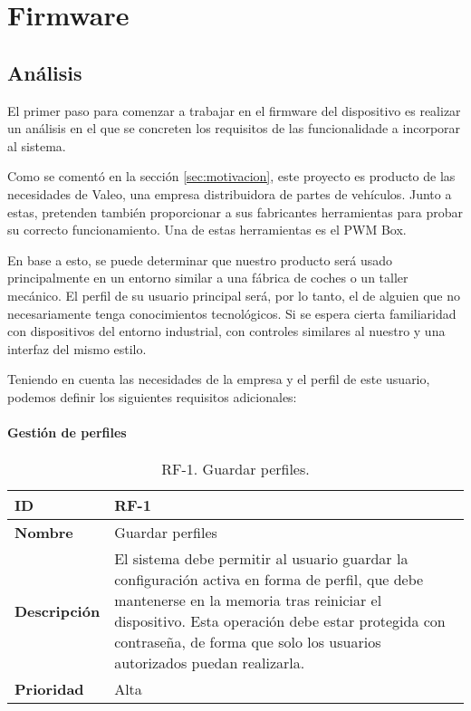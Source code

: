 \chapter{Firmware}
\label{ch:firmware}

\section{Análisis}
\label{sec:fw_analisis}

El primer paso para comenzar a trabajar en el firmware del dispositivo es realizar un análisis en el que se concreten los requisitos de las funcionalidade a incorporar al sistema.

Como se comentó en la sección \ref{sec:motivacion}, este proyecto es producto de las necesidades de Valeo, una empresa distribuidora de partes de vehículos. Junto a estas, pretenden también proporcionar a sus fabricantes herramientas para probar su correcto funcionamiento. Una de estas herramientas es el PWM Box.

En base a esto, se puede determinar que nuestro producto será usado principalmente en un entorno similar a una fábrica de coches o un taller mecánico. El perfil de su usuario principal será, por lo tanto, el de alguien que no necesariamente tenga conocimientos tecnológicos. Si se espera cierta familiaridad con dispositivos del entorno industrial, con controles similares al nuestro y una interfaz del mismo estilo.

Teniendo en cuenta las necesidades de la empresa y el perfil de este usuario, podemos definir los siguientes requisitos adicionales:

\clearpage

\subsubsection{Gestión de perfiles}

\begin{table}[h!]
    \centering
    \begin{tabular}{|m{2.5cm}|m{9.27cm}|}
        \hline
        \textbf{ID} & RF-1 \\
        \hline
        \textbf{Nombre} & Guardar perfiles \\
        \hline
        \textbf{Descripción} & El sistema debe permitir al usuario guardar la configuración activa en forma de perfil, que debe mantenerse en la memoria tras reiniciar el dispositivo. Esta operación debe estar protegida con contraseña, de forma que solo los usuarios autorizados puedan realizarla. \\
        \hline
        \textbf{Prioridad} & Alta \\
        \hline
    \end{tabular}
    \caption{RF-1. Guardar perfiles.}
\end{table}

